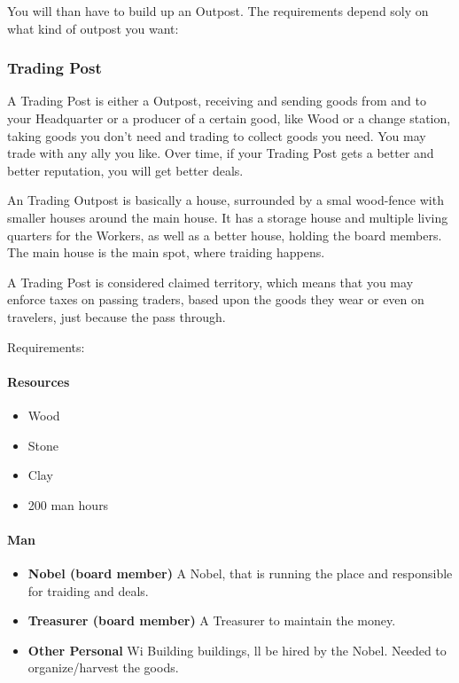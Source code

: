 \documentclass[10pt,twoside,twocolumn,openany]{book}
\begin{document}
You will than have to build up an Outpost. The requirements depend soly on what kind of outpost you want:

\subsubsection{Trading Post}

A Trading Post is either a Outpost, receiving and sending goods from and to your Headquarter or a producer of a certain good, like Wood or a change station, taking goods you don't need and trading to collect goods you need. You may trade with any ally you like. Over time, if your Trading Post gets a better and better reputation, you will get better deals.

An Trading Outpost is basically a house, surrounded by a smal wood-fence with smaller houses around the main house. It has a storage house and multiple living quarters for the Workers, as well as a better house, holding the board members. The main house is the main spot, where traiding happens.

A Trading Post is considered claimed territory, which means that you may enforce taxes on passing traders, based upon the goods they wear or even on travelers, just because the pass through.

Requirements:

\paragraph{Resources}
\begin{itemize}
\item Wood
\item Stone
\item Clay
\item 200 man hours
\end{itemize}

\paragraph{Man}
\begin{itemize}
\item \textbf{Nobel (board member)} A Nobel, that is running the place and responsible for traiding and deals.
\item \textbf{Treasurer (board member)} A Treasurer to maintain the money.
\item \textbf{Other Personal} Wi Building buildings, ll be hired by the Nobel. Needed to organize/harvest the goods.
\end{itemize}
\end{document}
